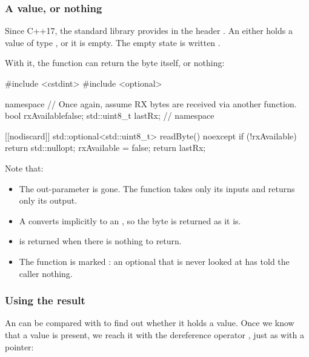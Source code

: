 \subsubsection{A value, or nothing}
Since C++17, the standard library provides  in the header
. An  either holds a value of type , or it is
empty. The empty state is written .

With it, the function can return the byte itself, or nothing:

\begin{cppcode}
#include <cstdint>
#include <optional>

namespace
{
// Once again, assume RX bytes are received via another function.
bool rxAvailable{false};
std::uint8_t lastRx{};
} // namespace

[[nodiscard]] std::optional<std::uint8_t> readByte() noexcept
{
    if (!rxAvailable) { return std::nullopt; }
    rxAvailable = false;
    return lastRx;
}
\end{cppcode}

\noindent Note that:
\begin{itemize}
  \item The out-parameter is gone. The function takes only its inputs and returns only its output.
  \item A  converts implicitly to an , so the byte is returned as it
    is.
  \item {} is returned when there is nothing to return.
  \item The function is marked \code{[[nodiscard]]}: an optional that is never looked at has told
    the caller nothing.
\end{itemize}

\subsubsection{Using the result}
An  can be compared with  to find out whether it holds a
value. Once we know that a value is present, we reach it with the dereference operator \code{*},
just as with a pointer:


